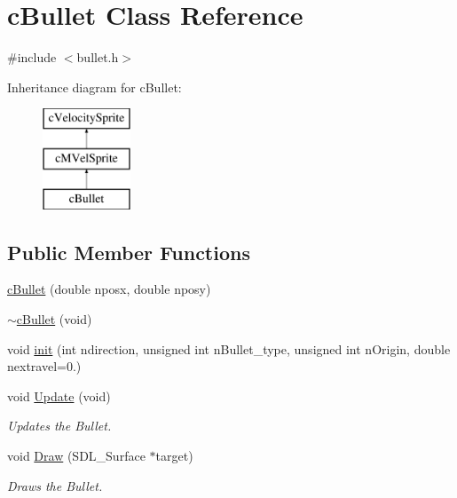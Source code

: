 \hypertarget{classc_bullet}{\section{c\-Bullet Class Reference}
\label{classc_bullet}
}


{\ttfamily \#include $<$bullet.\-h$>$}

Inheritance diagram for c\-Bullet\-:\begin{figure}[H]
\begin{center}
\leavevmode
\includegraphics[height=3.000000cm]{classc_bullet}
\end{center}
\end{figure}
\subsection*{Public Member Functions}
\begin{DoxyCompactItemize}
\item 
\hyperlink{classc_bullet_ac9a68c49e99fabe3a4352dbddf858310}{c\-Bullet} (double nposx, double nposy)
\item 
\hyperlink{classc_bullet_a52bc3566539019a6a58a8b0979fd0e22}{$\sim$c\-Bullet} (void)
\item 
void \hyperlink{classc_bullet_ae583bcd0a15e4f214be6160e9c621bb5}{init} (int ndirection, unsigned int n\-Bullet\-\_\-type, unsigned int n\-Origin, double nextravel=0.)
\item 
void \hyperlink{classc_bullet_a19e5203aca92a91dbb4ebf64a15c28f1}{Update} (void)
\begin{DoxyCompactList}\small\item\em Updates the Bullet. \end{DoxyCompactList}\item 
void \hyperlink{classc_bullet_a66a1f11209137959b2455a10efed94f4}{Draw} (S\-D\-L\-\_\-\-Surface $\ast$target)
\begin{DoxyCompactList}\small\item\em Draws the Bullet. \end{DoxyCompactList}\end{DoxyCompactItemize}
